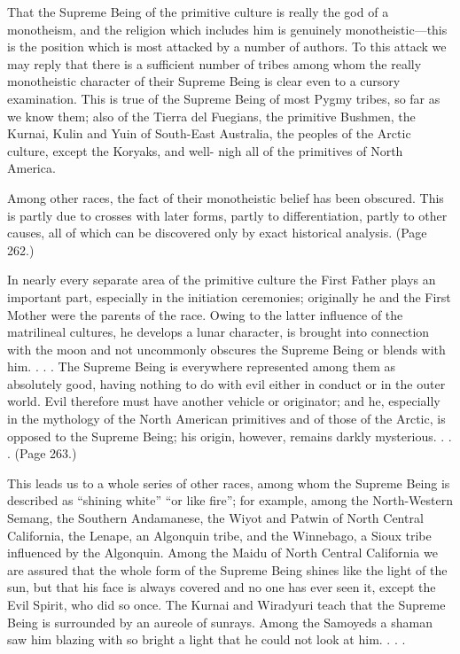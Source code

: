 That the Supreme Being of the primitive culture is really the god of a monotheism, and the
religion which includes him is genuinely monotheistic—this is the position which is most
attacked by a number of authors. To this attack we may reply that there is a sufficient number
of tribes among whom the really monotheistic character of their Supreme Being is clear even
to a cursory examination. This is true of the Supreme Being of most Pygmy tribes, so far as
we know them; also of the Tierra del Fuegians, the primitive Bushmen, the Kurnai, Kulin and
Yuin of South-East Australia, the peoples of the Arctic culture, except the Koryaks, and well-
nigh all of the primitives of North America.

Among other races, the fact of their monotheistic belief has been obscured. This is partly due
to crosses with later forms, partly to differentiation, partly to other causes, all of which can
be discovered only by exact historical analysis. (Page 262.)

In nearly every separate area of the primitive culture the First Father plays an important part,
especially in the initiation ceremonies; originally he and the First Mother were the parents of
the race. Owing to the latter influence of the matrilineal cultures, he develops a lunar
character, is brought into connection with the moon and not uncommonly obscures the
Supreme Being or blends with him. . . . The Supreme Being is everywhere represented
among them as absolutely good, having nothing to do with evil either in conduct or in the
outer world. Evil therefore must have another vehicle or originator; and he, especially in the
mythology of the North American primitives and of those of the Arctic, is opposed to the
Supreme Being; his origin, however, remains darkly mysterious. . . . (Page 263.)

This leads us to a whole series of other races, among whom the Supreme Being is described
as ``shining white'' ``or like fire''; for example, among the North-Western Semang, the
Southern Andamanese, the Wiyot and Patwin of North Central California, the Lenape, an
Algonquin tribe, and the Winnebago, a Sioux tribe influenced by the Algonquin. Among the
Maidu of North Central California we are assured that the whole form of the Supreme Being
shines like the light of the sun, but that his face is always covered and no one has ever seen it,
except the Evil Spirit, who did so once. The Kurnai and Wiradyuri teach that the Supreme
Being is surrounded by an aureole of sunrays. Among the Samoyeds a shaman saw him
blazing with so bright a light that he could not look at him. . . .

